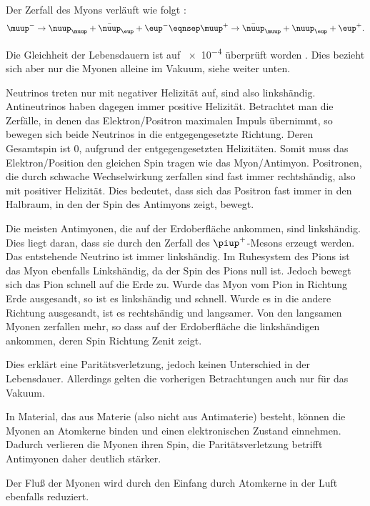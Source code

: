 \documentclass[11pt, ngerman, fleqn, DIV=15, headinclude, BCOR=2cm]{scrreprt}
\begin{document}
Der Zerfall des Myons verläuft wie folgt \parencite[144]{Povh/Teilchen_Kerne}:
\[
    \muup^- \to \nuup_\muup + \bar \nuup_\eup + \eup^-
    \eqnsep
    \muup^+ \to \bar \nuup_\muup + \nuup_\eup + \eup^+.
\]

Die Gleichheit der Lebensdauern ist auf \num{e-4} überprüft worden
\parencite{Wikipedia/Muon}. Dies bezieht sich aber nur die Myonen alleine im
Vakuum, siehe weiter unten.

Neutrinos treten nur mit negativer Helizität auf, sind also linkshändig.
Antineutrinos haben dagegen immer positive Helizität. Betrachtet man die
Zerfälle, in denen das Elektron/Positron maximalen Impuls übernimmt, so bewegen
sich beide Neutrinos in die entgegengesetzte Richtung. Deren Gesamtspin ist 0,
aufgrund der entgegengesetzten Helizitäten. Somit muss das Elektron/Position
den gleichen Spin tragen wie das Myon/Antimyon. Positronen, die durch schwache
Wechselwirkung zerfallen sind fast immer rechtshändig, also mit positiver
Helizität. Dies bedeutet, dass sich das Positron fast immer in den Halbraum, in
den der Spin des Antimyons zeigt, bewegt.
\parencite[§3]{Egede/Parity_Violation}

Die meisten Antimyonen, die auf der Erdoberfläche ankommen, sind linkshändig.
Dies liegt daran, dass sie durch den Zerfall des $\piup^+$-Mesons erzeugt
werden. Das entstehende Neutrino ist immer linkshändig. Im Ruhesystem des Pions
ist das Myon ebenfalls Linkshändig, da der Spin des Pions null ist. Jedoch
bewegt sich das Pion schnell auf die Erde zu. Wurde das Myon vom Pion in
Richtung Erde ausgesandt, so ist es linkshändig und schnell. Wurde es in die
andere Richtung ausgesandt, ist es rechtshändig und langsamer. Von den
langsamen Myonen zerfallen mehr, so dass auf der Erdoberfläche die
linkshändigen ankommen, deren Spin Richtung Zenit zeigt.
\parencite[S.~29f]{Egede/Parity_Violation}

Dies erklärt eine Paritätsverletzung, jedoch keinen Unterschied in der
Lebensdauer. Allerdings gelten die vorherigen Betrachtungen auch nur für das
Vakuum.

In Material, das aus Materie (also nicht aus Antimaterie) besteht, können die
Myonen an Atomkerne binden und einen elektronischen Zustand einnehmen. Dadurch
verlieren die Myonen ihren Spin, die Paritätsverletzung betrifft Antimyonen
daher deutlich stärker. \parencite[30]{Egede/Parity_Violation}

Der Fluß der Myonen wird durch den Einfang durch Atomkerne in der Luft
ebenfalls reduziert. \parencite{TwoBs/Myon_Decay}
\end{document}

